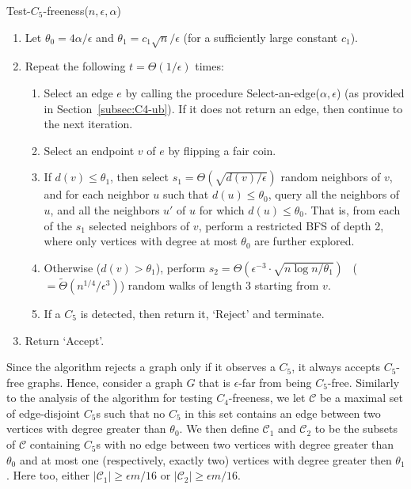 \documentclass{article}
\newcommand{\eps}{\epsilon}
\newcommand{\calC}{{\mathcal{C}}}
\newcommand{\commentt}[1]{ {}}
\begin{document}
\medskip\noindent
\textsf{Test-$C_5$-freeness}($n,\epsilon,\alpha$)\label{alg:C5}
\begin{enumerate}
\item Let $\theta_0 = 4\alpha/\epsilon$ and $\theta_1 =  c_1\sqrt{n}/\eps$ (for a sufficiently large constant $c_1$).
\label{step:set_params_C5}
\item Repeat the following %
$t = \Theta(1/\eps)$ times:
  \begin{enumerate}
     \item Select an edge $e$ by calling the procedure \textsf{Select-an-edge}($\alpha,\epsilon$) (as provided in Section~\ref{subsec:C4-ub}).  If it
     does not return an edge, then continue to the next iteration.
     \item Select an endpoint $v$ of $e$ by flipping a fair coin.
     \item \label{step:random-neighbors-C5} If $d(v) \leq \theta_1$, then select %
     $s_1= \Theta(\sqrt{d(v)/\eps})$ 
     random neighbors of $v$, and for each neighbor $u$ such that $d(u) \leq \theta_0$, query all the neighbors of $u$, and all the neighbors $u'$ of $u$ for which $d(u) \leq \theta_0$.
     That is, from each of the $s_1$ selected neighbors of $v$, perform a restricted BFS of depth 2, where only vertices with degree at most $\theta_0$ are further explored.
     \item \label{step:random-walk-C5} Otherwise ($d(v) > \theta_1$), perform 
     $s_2 = \Theta(\eps^{-3}\cdot\sqrt{n\log n/\theta_1})$ ~($=\tilde{\Theta}(n^{1/4}/\eps^3)$)
     random walks of length $3$ starting from $v$. %
     \item If a $C_5$ is detected, then return it, `Reject' and terminate.
  \end{enumerate}
  \item Return `Accept'.
\end{enumerate}
Since the algorithm rejects a graph only if it observes a $C_5$, it always accepts $C_5$-free graphs. Hence, consider a graph $G$  that is $\eps$-far from being $C_5$-free. 
Similarly to the analysis of the algorithm for testing $C_4$-freeness, we let $\calC$ be a maximal set of edge-disjoint $C_5$s such that no $C_5$ in this set contains an edge between two vertices with degree greater than $\theta_0$. We then define $\calC_1$ and $\calC_2$ to be the subsets of $\calC$ containing $C_5$s with no edge between two vertices with degree greater than $\theta_0$ and at most one (respectively, exactly two) vertices with degree greater then $\theta_1$. Here too, either $|\calC_1|\geq \eps m/16$ or $|\calC_2|\geq \eps m/16$.
\end{document}
